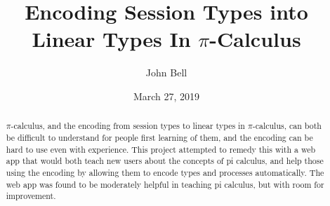 \documentclass{l4proj}
\begin{document}
\title{Encoding Session Types into Linear Types In $\pi$-Calculus}
\author{John Bell}
\date{March 27, 2019}

\maketitle

\begin{abstract}
    $\pi$-calculus, and the encoding from session types to linear types in $\pi$-calculus, can both be difficult to understand for people first learning of them, and the encoding can be hard to use even with experience. This project attempted to remedy this with a web app that would both teach new users about the concepts of pi calculus, and help those using the encoding by  allowing them to encode types and processes automatically. The web app was found to be moderately helpful in teaching pi calculus, but with room for improvement.
\end{abstract}


%
%
\def\consentname {John Bell} %
\def\consentdate {25 March 2019} %
%
\educationalconsent


\tableofcontents
\end{document}
